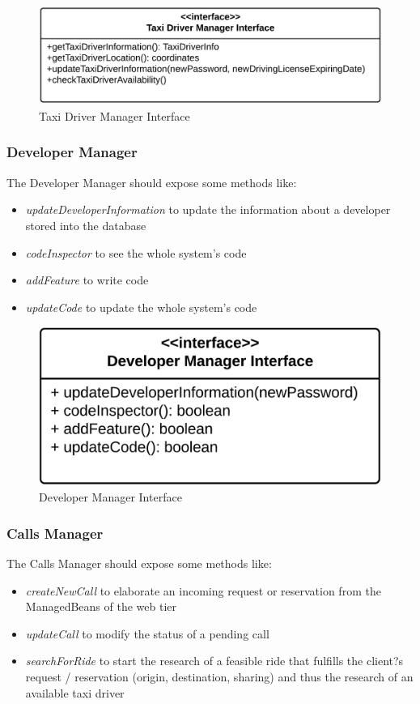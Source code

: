 \begin{figure}[htbp]
\centering
\includegraphics[width=\textwidth]{cpt/img/ComponentInterfacesTaxiDriverManagerInterface}
\caption{Taxi Driver Manager Interface}
\end{figure}
\clearpage

\subsubsection{Developer Manager}
The Developer Manager should expose some methods like:
\begin{itemize}
	\item \textit{updateDeveloperInformation} to update the information about a developer stored into the database
	\item \textit{codeInspector} to see the whole system's code
	\item \textit{addFeature} to write code
	\item \textit{updateCode} to update the whole system's code
\end{itemize}

\begin{figure}[htbp]
\centering
\includegraphics[width=\textwidth]{cpt/img/ComponentInterfacesDeveloperManagerInterface}
\caption{Developer Manager Interface}
\end{figure}
\clearpage

\subsubsection{Calls Manager}
The Calls Manager should expose some methods like:
\begin{itemize}
	\item \textit{createNewCall} to elaborate an incoming request or reservation from the ManagedBeans of the web tier
	\item \textit{updateCall} to modify the status of a pending call
	\item \textit{searchForRide} to start the research of a feasible ride that fulfills the client?s request / reservation (origin, destination, sharing) and thus the research of an available taxi driver
\end{itemize}

